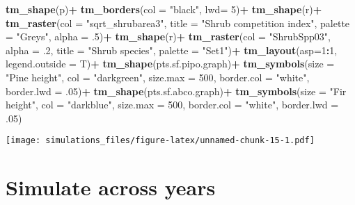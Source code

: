 \documentclass[]{article}
\newenvironment{Shaded}{\begin{snugshade}}{\end{snugshade}}
\newcommand{\KeywordTok}[1]{\textcolor[rgb]{0.13,0.29,0.53}{\textbf{#1}}}
\newcommand{\DataTypeTok}[1]{\textcolor[rgb]{0.13,0.29,0.53}{#1}}
\newcommand{\DecValTok}[1]{\textcolor[rgb]{0.00,0.00,0.81}{#1}}
\newcommand{\StringTok}[1]{\textcolor[rgb]{0.31,0.60,0.02}{#1}}
\newcommand{\OperatorTok}[1]{\textcolor[rgb]{0.81,0.36,0.00}{\textbf{#1}}}
\newcommand{\NormalTok}[1]{#1}
\begin{document}
\begin{Shaded}
\begin{Highlighting}[]
\KeywordTok{tm_shape}\NormalTok{(p)}\OperatorTok{+}
\StringTok{  }\KeywordTok{tm_borders}\NormalTok{(}\DataTypeTok{col =} \StringTok{"black"}\NormalTok{, }\DataTypeTok{lwd=} \DecValTok{5}\NormalTok{)}\OperatorTok{+}
\KeywordTok{tm_shape}\NormalTok{(r)}\OperatorTok{+}
\StringTok{  }\KeywordTok{tm_raster}\NormalTok{(}\DataTypeTok{col =} \StringTok{"sqrt_shrubarea3"}\NormalTok{, }\DataTypeTok{title =} \StringTok{"Shrub competition index"}\NormalTok{, }\DataTypeTok{palette =} \StringTok{"Greys"}\NormalTok{, }\DataTypeTok{alpha =}\NormalTok{ .}\DecValTok{5}\NormalTok{)}\OperatorTok{+}
\KeywordTok{tm_shape}\NormalTok{(r)}\OperatorTok{+}
\StringTok{  }\KeywordTok{tm_raster}\NormalTok{(}\DataTypeTok{col =} \StringTok{"ShrubSpp03"}\NormalTok{, }\DataTypeTok{alpha =}\NormalTok{ .}\DecValTok{2}\NormalTok{, }\DataTypeTok{title =} \StringTok{"Shrub species"}\NormalTok{, }\DataTypeTok{palette =} \StringTok{"Set1"}\NormalTok{)}\OperatorTok{+}
\StringTok{  }\KeywordTok{tm_layout}\NormalTok{(}\DataTypeTok{asp=}\DecValTok{1}\OperatorTok{:}\DecValTok{1}\NormalTok{, }\DataTypeTok{legend.outside =}\NormalTok{ T)}\OperatorTok{+}
\KeywordTok{tm_shape}\NormalTok{(pts.sf.pipo.graph)}\OperatorTok{+}
\StringTok{  }\KeywordTok{tm_symbols}\NormalTok{(}\DataTypeTok{size =} \StringTok{"Pine height"}\NormalTok{, }\DataTypeTok{col =} \StringTok{"darkgreen"}\NormalTok{, }\DataTypeTok{size.max =} \DecValTok{500}\NormalTok{, }\DataTypeTok{border.col =} \StringTok{"white"}\NormalTok{, }\DataTypeTok{border.lwd =}\NormalTok{ .}\DecValTok{05}\NormalTok{)}\OperatorTok{+}
\KeywordTok{tm_shape}\NormalTok{(pts.sf.abco.graph)}\OperatorTok{+}
\StringTok{  }\KeywordTok{tm_symbols}\NormalTok{(}\DataTypeTok{size =} \StringTok{"Fir height"}\NormalTok{, }\DataTypeTok{col =} \StringTok{"darkblue"}\NormalTok{, }\DataTypeTok{size.max =} \DecValTok{500}\NormalTok{, }\DataTypeTok{border.col =} \StringTok{"white"}\NormalTok{, }\DataTypeTok{border.lwd =}\NormalTok{ .}\DecValTok{05}\NormalTok{)}
\end{Highlighting}
\end{Shaded}

\texttt{[image: simulations\_files/figure-latex/unnamed-chunk-15-1.pdf]}

\section{Simulate across years}\label{simulate-across-years}
\end{document}
